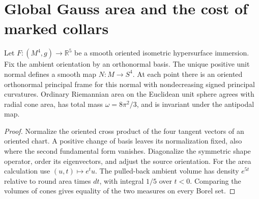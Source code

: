 \section{Global Gauss area and the cost of marked collars}
\label{sec:ed03-global-gauss-caps}

\begin{theorem}
\label{thm:ed03-global-normal}
\leanok
Let $F:(M^4,g)\to\mathbb R^5$ be a smooth oriented isometric hypersurface
immersion. Fix the ambient orientation by an orthonormal basis. The unique
positive unit normal defines a smooth map $N:M\to S^4$. At each point
there is an oriented orthonormal principal frame for this normal with
nondecreasing signed principal curvatures. Ordinary Riemannian area on
the Euclidean unit sphere agrees with radial cone area, has total mass
$\omega=8\pi^2/3$, and is invariant under the antipodal map.
\end{theorem}
\begin{proof}
\leanok
Normalize the oriented cross product of the four tangent vectors of an
oriented chart. A positive change of basis leaves its normalization fixed,
also where the second fundamental form vanishes. Diagonalize the symmetric
shape operator, order its eigenvectors, and adjust the source orientation.
For the area calculation use $(u,t)\mapsto e^tu$. The pulled-back ambient
volume has density $e^{5t}$ relative to round area times $dt$, with integral
$1/5$ over $t<0$. Comparing the volumes of cones gives equality of the
two measures on every Borel set.
\end{proof}

